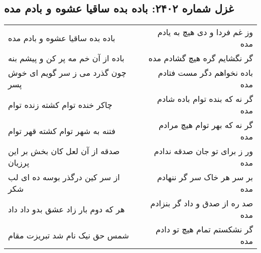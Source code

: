 \begin{center}
\section*{غزل شماره ۲۴۰۲: باده بده ساقیا عشوه و بادم مده}
\label{sec:2402}
\begin{longtable}{l p{0.5cm} r}
باده بده ساقیا عشوه و بادم مده
&&
وز غم فردا و دی هیچ به یادم مده
\\
باده از آن خم مه پر کن و پیشم بنه
&&
گر نگشایم گره هیچ گشادم مده
\\
چون گذرد می ز سر گویم ای خوش پسر
&&
باده نخواهم دگر مست فتادم مده
\\
چاکر خنده توام کشته زنده توام
&&
گر نه که بنده توام باده شادم مده
\\
فتنه به شهر توام کشته قهر توام
&&
گر نه که بهر توام هیچ مرادم مده
\\
صدقه از آن لعل کان بخش بر این پرزیان
&&
ور ز برای تو جان صدقه ندادم مده
\\
از سر کین درگذر بوسه ده ای لب شکر
&&
بر سر هر خاک سر گر ننهادم مده
\\
هر که دوم بار زاد عشق بدو داد داد
&&
صد ره از صدق و داد گر بنزادم مده
\\
شمس حق نیک نام شد تبریزت مقام
&&
گر نشکستم تمام هیچ تو دادم مده
\\
\end{longtable}
\end{center}
